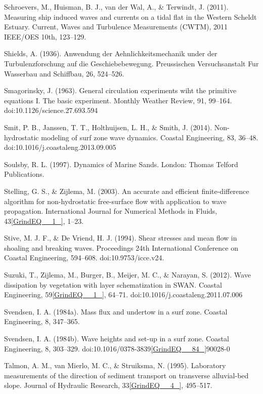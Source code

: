 \documentclass{article}
\begin{document}
\noindent Schroevers, M., Huisman, B. J., van der Wal, A., \& Terwindt, J. (2011). Measuring ship induced waves and currents on a tidal flat in the Western Scheldt Estuary. Current, Waves and Turbulence Measurements (CWTM), 2011 IEEE/OES 10th, 123--129.

\noindent Shields, A. (1936). Anwendung der Aehnlichkeitsmechanik under der Turbulenzforschung auf die Geschiebebewegung. Preussischen Versuchsanstalt Fur Wasserbau and Schiffbau, 26, 524--526.

\noindent Smagorinsky, J. (1963). General circulation experiments wiht the primitive equations I. The basic experiment. Monthly Weather Review, 91, 99--164. doi:10.1126/science.27.693.594

\noindent Smit, P. B., Janssen, T. T., Holthuijsen, L. H., \& Smith, J. (2014). Non-hydrostatic modeling of surf zone wave dynamics. Coastal Engineering, 83, 36--48. doi:10.1016/j.coastaleng.2013.09.005

\noindent Soulsby, R. L. (1997). Dynamics of Marine Sands. London: Thomas Telford Publications.

\noindent Stelling, G. S., \& Zijlema, M. (2003). An accurate and efficient finite-difference algorithm for non-hydrostatic free-surface flow with application to wave propagation. International Journal for Numerical Methods in Fluids, 43\eqref{GrindEQ__1_}, 1--23.

\noindent Stive, M. J. F., \& De Vriend, H. J. (1994). Shear stresses and mean flow in shoaling and breaking waves. Proceedings 24th International Conference on Coastal Engineering, 594--608. doi:10.9753/icce.v24.

\noindent Suzuki, T., Zijlema, M., Burger, B., Meijer, M. C., \& Narayan, S. (2012). Wave dissipation by vegetation with layer schematization in SWAN. Coastal Engineering, 59\eqref{GrindEQ__1_}, 64--71. doi:10.1016/j.coastaleng.2011.07.006

\noindent Svendsen, I. A. (1984a). Mass flux and undertow in a surf zone. Coastal Engineering, 8, 347--365.

\noindent Svendsen, I. A. (1984b). Wave heights and set-up in a surf zone. Coastal Engineering, 8, 303--329. doi:10.1016/0378-3839\eqref{GrindEQ__84_}90028-0

\noindent Talmon, A. M., van Mierlo, M. C., \& Struiksma, N. (1995). Laboratory measurements of the direction of sediment transport on transverse alluvial-bed slope. Journal of Hydraulic Research, 33\eqref{GrindEQ__4_}, 495--517.
\end{document}
